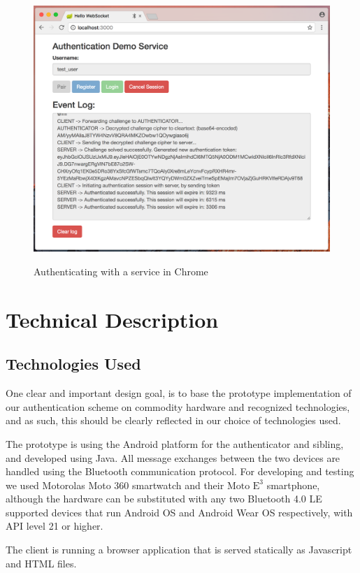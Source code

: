 \begin{figure}
       \includegraphics[width=\linewidth]{gfx/login} 
       \label{fig:client}
       \caption{Authenticating with a service in Chrome} 
\end{figure}


\section{Technical Description}
\subsection{Technologies Used}
One clear and important design goal, is to base the prototype implementation of our authentication scheme on commodity hardware and recognized technologies, and as such, this should be clearly reflected in our choice of technologies used. 

The prototype is using the Android platform for the \gls{authenticator} and \gls{sibling}, and developed using Java. All message exchanges between the two devices are handled using the Bluetooth communication protocol. For developing and testing we used Motorolas Moto 360 smartwatch and their $\text{Moto E}^3$ smartphone, although the hardware can be substituted with any two Bluetooth 4.0 LE supported devices that run Android OS and Android Wear OS respectively, with API level 21 or higher. 

The \gls{client} is running a browser application that is served statically as Javascript and HTML files.

